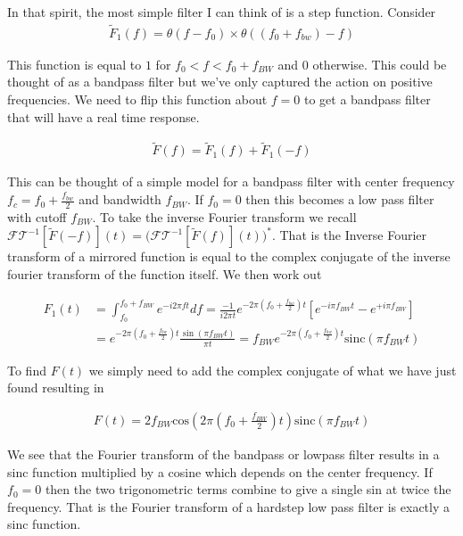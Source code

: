 \documentclass[12pt]{article}
\begin{document}
In that spirit, the most simple filter I can think of is a step function. Consider
\begin{align}
\tilde{F}_1(f) = \theta(f-f_0)\times \theta((f_0+f_{bw})-f)
\end{align}

This function is equal to $1$ for $f_0<f<f_0+f_{BW}$ and $0$ otherwise. This could be thought of as a bandpass filter but we've only captured the action on positive frequencies. We need to flip this function about $f=0$ to get a bandpass filter that will have a real time response.

\begin{align}
\tilde{F}(f) = \tilde{F}_1(f)+\tilde{F}_1(-f)
\end{align}

This can be thought of a simple model for a bandpass filter with center frequency $f_c = f_0+\frac{f_{bw}}{2}$ and bandwidth $f_{BW}$. If $f_0=0$ then this becomes a low pass filter with cutoff $f_{BW}$. To take the inverse Fourier transform we recall $\mathcal{FT}^{-1}[\tilde{F}(-f)](t) = \big(\mathcal{FT}^{-1}[\tilde{F}(f)](t)\big)^*$. That is the Inverse Fourier transform of a mirrored function is equal to the complex conjugate of the inverse fourier transform of the function itself. We then work out

\begin{align}
F_1(t) &= \int_{f_0}^{f_0+f_{BW}} e^{-i2\pi f t} df = \frac{-1}{i 2\pi t} e^{-2\pi\left(f_0+\frac{f_{bw}}{2}\right)t} \left[e^{-i\pi f_{BW} t}-e^{+i \pi f_{BW}}\right]\\
&= e^{-2\pi\left(f_0+\frac{f_{bw}}{2}\right)t} \frac{\sin(\pi f_{BW} t)}{\pi t} = f_{BW} e^{-2\pi\left(f_0+\frac{f_{bw}}{2}\right)t} \text{sinc}(\pi f_{BW} t)
\end{align}

To find $F(t)$ we simply need to add the complex conjugate of what we have just found resulting in

\begin{align}
F(t) = 2 f_{BW} \text{cos}\left(2\pi \left(f_0+\frac{f_{BW}}{2}\right) t \right) \text{sinc}(\pi f_{BW} t)
\end{align}

We see that the Fourier transform of the bandpass or lowpass filter results in a sinc function multiplied by a cosine which depends on the center frequency. If $f_0 =0$ then the two trigonometric terms combine to give a single sin at twice the frequency. That is the Fourier transform of a hardstep low pass filter is exactly a sinc function.
\end{document}
